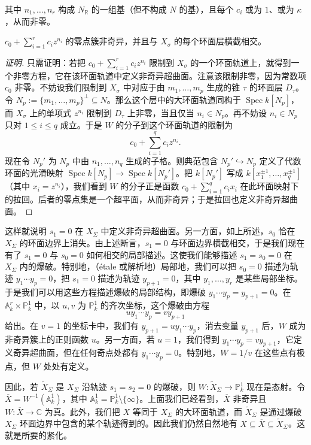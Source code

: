 其中 $n_1,\dots,n_r$ 构成 $N_{\mathbb{R}}$ 的一组基（但不构成 $N$ 的基），且每个 $c_i$ 或为 $1$、或为 $\kappa$，从而非零。

$c_0+\sum_{i=1}^{r}c_iz^{n_i}$ 的零点簇非奇异，并且与 $X_{\sigma}$ 的每个环面层横截相交。

\begin{proof}[证明]
只需证明：若把 $c_0+\sum_{i=1}^{r}c_iz^{n_i}$ 限制到 $X_{\sigma}$ 的一个环面轨道上，就得到一个非零方程，它在该环面轨道中定义非奇异超曲面。注意该限制非零，因为常数项 $c_0$ 非零。不妨设我们限制到 $X_{\sigma}$ 中对应于由 $m_1,\dots,m_p$ 生成的锥 $\tau$ 的环面层 $D_{\tau}$。令 $N_p:=\{m_1,\dots,m_p\}^{\perp}\subseteq N$。那么这个层中的大环面轨道同构于 $\operatorname{Spec} k[N_p]$，而 $X_{\sigma}$ 上的单项式 $z^{n_i}$ 限制到 $D_{\tau}$ 上非零，当且仅当 $n_i\in N_p$。再不妨设 $n_i\in N_p$ 只对 $1\le i\le q$ 成立。于是 $W$ 的分子到这个环面轨道的限制为
\[
  c_0+\sum_{i=1}^{q}c_iz^{n_i}.
\]
现在令 $N_p'$ 为 $N_p$ 中由 $n_1,\dots,n_q$ 生成的子格。则典范包含 $N_p'\hookrightarrow N_p$ 定义了代数环面的光滑映射 $\operatorname{Spec} k[N_p]\to\operatorname{Spec} k[N_p']$。把 $k[N_p']$ 写成 $k[x_1^{\pm1},\dots,x_q^{\pm1}]$（其中 $x_i=z^{n_i}$），我们看到 $W$ 的分子正是函数 $c_0+\sum_{i=1}^{q}c_ix_i$ 在此环面映射下的拉回。后者的零点集是一个超平面，从而非奇异；于是拉回也定义非奇异超曲面。
\end{proof}

这样就说明 $s_1=0$ 在 $X_{\Sigma}$ 中定义非奇异超曲面。另一方面，如上所述，$s_0$ 恰在 $X_{\Sigma}$ 的环面边界上消失。由上述断言，$s_1=0$ 与环面边界横截相交，于是我们现在有了 $s_1=0$ 与 $s_0=0$ 如何相交的局部描述。这使我们能够描述 $s_1=s_0=0$ 在 $X_{\Sigma}$ 内的爆破。特别地，（étale 或解析地）局部地，我们可以把 $s_0=0$ 描述为轨迹 $y_1\cdots y_p=0$，把 $s_1=0$ 描述为轨迹 $y_{p+1}=0$，其中 $y_1,\dots,y_r$ 是某些局部坐标。于是我们可以用这些方程描述爆破的局部结构，即爆破 $y_1\cdots y_p=y_{p+1}=0$。在 $\mathbb{A}^r_k\times\mathbb{P}^1_k$ 中，以 $u,v$ 为 $\mathbb{P}^1_k$ 的齐次坐标，这个爆破由方程
\[
  uy_1\cdots y_p=vy_{p+1}
\]
给出。在 $v=1$ 的坐标卡中，我们有 $y_{p+1}=uy_1\cdots y_p$，消去变量 $y_{p+1}$ 后，$W$ 成为非奇异簇上的正则函数 $u$。另一方面，若 $u=1$，我们得到 $y_1\cdots y_p=vy_{p+1}$，它定义奇异超曲面，但在任何奇点处都有 $y_1\cdots y_p=0$。特别地，$W=1/v$ 在这些点有极点，但 $W$ 处处有定义。

因此，若 $\tilde X_{\Sigma}$ 是 $X_{\Sigma}$ 沿轨迹 $s_1=s_2=0$ 的爆破，则 $W:\tilde X_{\Sigma}\to\mathbb{P}^1_k$ 现在是态射。令 $\overline{X}=W^{-1}(\mathbb{A}^1_k)$，其中 $\mathbb{A}^1_k=\mathbb{P}^1_k\setminus\{\infty\}$。上面我们已经看到，$\overline{X}$ 非奇异且 $W:\overline{X}\to\mathbb{C}$ 为真。此外，我们把 $X$ 等同于 $X_{\Sigma}$ 的大环面轨道，而 $\tilde X_{\Sigma}$ 是通过爆破 $X_{\Sigma}$ 环面边界中包含的某个轨迹得到的。因此我们仍然自然地有 $X\subseteq\overline{X}\subseteq\tilde X_{\Sigma}$。这就是所要的紧化。

